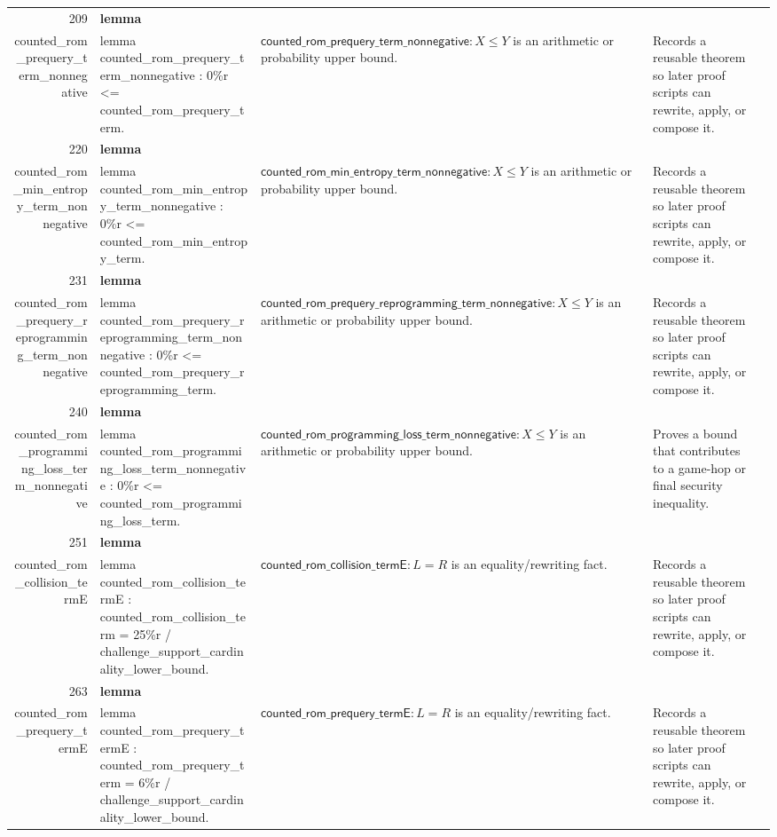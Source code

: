 \documentclass[10pt]{article}
\newcommand{\ec}[1]{\begingroup\ttfamily\scriptsize #1\endgroup}
\begin{document}
\begin{longtable}{r L{0.17\textwidth} L{0.26\textwidth} L{0.27\textwidth} L{0.20\textwidth}}
209 & \textbf{lemma}\\\ec{counted\_rom\_prequery\_term\_nonnegative} & \ec{lemma counted\_rom\_prequery\_term\_nonnegative : 0\%r <= counted\_rom\_prequery\_term.} & \(\mathsf{counted\_rom\_prequery\_term\_nonnegative} : X \le Y\) is an arithmetic or probability upper bound. & Records a reusable theorem so later proof scripts can rewrite, apply, or compose it. \\
220 & \textbf{lemma}\\\ec{counted\_rom\_min\_entropy\_term\_nonnegative} & \ec{lemma counted\_rom\_min\_entropy\_term\_nonnegative : 0\%r <= counted\_rom\_min\_entropy\_term.} & \(\mathsf{counted\_rom\_min\_entropy\_term\_nonnegative} : X \le Y\) is an arithmetic or probability upper bound. & Records a reusable theorem so later proof scripts can rewrite, apply, or compose it. \\
231 & \textbf{lemma}\\\ec{counted\_rom\_prequery\_reprogramming\_term\_nonnegative} & \ec{lemma counted\_rom\_prequery\_reprogramming\_term\_nonnegative : 0\%r <= counted\_rom\_prequery\_reprogramming\_term.} & \(\mathsf{counted\_rom\_prequery\_reprogramming\_term\_nonnegative} : X \le Y\) is an arithmetic or probability upper bound. & Records a reusable theorem so later proof scripts can rewrite, apply, or compose it. \\
240 & \textbf{lemma}\\\ec{counted\_rom\_programming\_loss\_term\_nonnegative} & \ec{lemma counted\_rom\_programming\_loss\_term\_nonnegative : 0\%r <= counted\_rom\_programming\_loss\_term.} & \(\mathsf{counted\_rom\_programming\_loss\_term\_nonnegative} : X \le Y\) is an arithmetic or probability upper bound. & Proves a bound that contributes to a game-hop or final security inequality. \\
251 & \textbf{lemma}\\\ec{counted\_rom\_collision\_termE} & \ec{lemma counted\_rom\_collision\_termE : counted\_rom\_collision\_term = 25\%r / challenge\_support\_cardinality\_lower\_bound.} & \(\mathsf{counted\_rom\_collision\_termE} : L = R\) is an equality/rewriting fact. & Records a reusable theorem so later proof scripts can rewrite, apply, or compose it. \\
263 & \textbf{lemma}\\\ec{counted\_rom\_prequery\_termE} & \ec{lemma counted\_rom\_prequery\_termE : counted\_rom\_prequery\_term = 6\%r / challenge\_support\_cardinality\_lower\_bound.} & \(\mathsf{counted\_rom\_prequery\_termE} : L = R\) is an equality/rewriting fact. & Records a reusable theorem so later proof scripts can rewrite, apply, or compose it. \\

\end{longtable}
\end{document}
